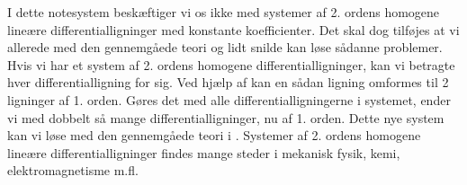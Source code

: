 \begin{info}
I dette notesystem beskæftiger vi os ikke med systemer af 2. ordens homogene lineære differentialligninger med konstante koefficienter. Det skal dog tilføjes at vi allerede med den gennemgåede teori og lidt snilde kan løse sådanne problemer. Hvis vi har et system af 2. ordens homogene differentialligninger, kan vi betragte hver differentialligning for sig. Ved hjælp af  kan en sådan ligning omformes til 2 ligninger af 1. orden. Gøres det med alle differentialligningerne i systemet, ender vi med dobbelt så mange differentialligninger, nu af 1. orden. Dette nye system kan vi løse med den gennemgåede teori i . Systemer af 2. ordens homogene lineære differentialligninger findes mange steder i mekanisk fysik, kemi, elektromagnetisme m.fl.
\end{info}

